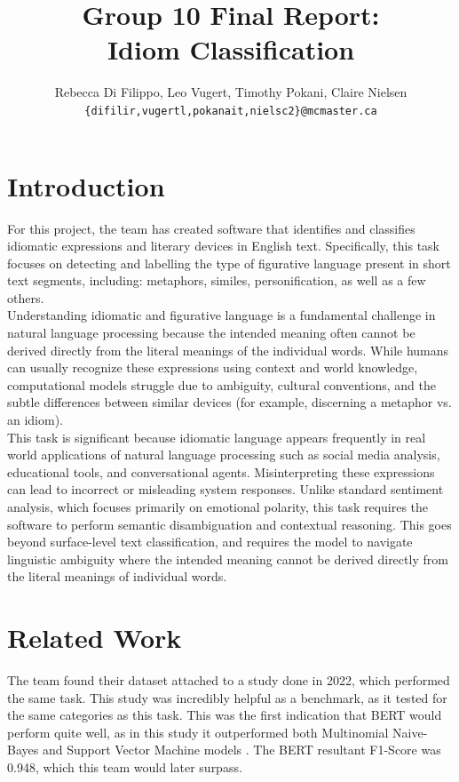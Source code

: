\documentclass[11pt]{article}
\title{Group 10 Final Report:\\Idiom Classification}
\author{Rebecca Di Filippo, Leo Vugert, Timothy Pokani, Claire Nielsen \\
  \texttt{\{difilir,vugertl,pokanait,nielsc2\}@mcmaster.ca} }
\begin{document}
\maketitle

\section{Introduction}

For this project, the team has created software that identifies and classifies idiomatic expressions and literary devices in English text. Specifically, this task
focuses on detecting and labelling the type of figurative language present in short text segments, including: metaphors, similes, personification, as well as a few others. \\

Understanding idiomatic and figurative language is a fundamental challenge in natural language processing because the intended meaning often cannot be
derived directly from the literal meanings of the individual words. While humans can usually recognize these expressions using context and world knowledge,
computational models struggle due to ambiguity, cultural conventions, and the subtle differences between similar devices (for example, discerning a metaphor vs. an idiom).\\

This task is significant because idiomatic language appears frequently in real world applications of natural language processing such as social media analysis, educational tools, and conversational agents. Misinterpreting these expressions can lead to incorrect or misleading system responses. Unlike standard sentiment analysis, which focuses primarily on emotional polarity, this task requires the software to perform semantic disambiguation and contextual reasoning. This goes beyond surface-level text classification, and requires the model to navigate linguistic ambiguity where the intended meaning cannot be derived directly from the literal meanings of individual words.\\

\section{Related Work}

The team found their dataset attached to a study done in 2022, which performed the same task. This study was incredibly helpful as a benchmark, as it tested for the same categories as this task. This was the first indication that BERT would perform quite well, as in this study it outperformed both Multinomial Naive-Bayes and Support Vector Machine models \citet{adewumi2022potentialidiomaticexpressionpieenglish}. The BERT resultant F1-Score was 0.948, which this team would later surpass. \\
\end{document}
